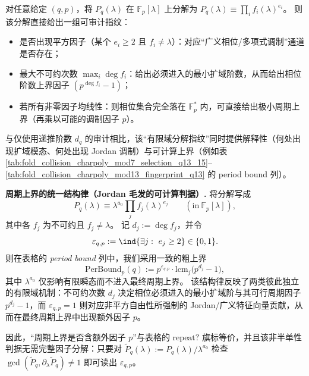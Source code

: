 \begin{remark}\label{rem:pom-charpoly-modp-audit-method}
对任意给定 \((q,p)\)，将 \(P_q(\lambda)\) 在 \(\mathbb{F}_p[\lambda]\) 上分解为
\(
P_q(\lambda)\equiv \prod_i f_i(\lambda)^{e_i}
 \)。
则该分解直接给出一组可审计指纹：
\begin{itemize}
  \item 是否出现平方因子（某个 \(e_i\ge 2\) 且 \(f_i\neq \lambda\)）：对应“广义相位/多项式调制”通道是否存在；
  \item 最大不可约次数 \(\max_i \deg f_i\)：给出必须进入的最小扩域阶数，从而给出相位阶数上界因子 \((p^{\deg f_i}-1)\)；
  \item 若所有非零因子均线性：则相位集合完全落在 \(\mathbb{F}_p^\ast\) 内，可直接给出极小周期上界（再乘以可能的调制因子 \(p\)）。
\end{itemize}
与仅使用递推阶数 \(d_q\) 的审计相比，该“有限域分解指纹”同时提供解释性（何处出现扩域模态、何处出现 Jordan 调制）与可计算上界（例如表 \ref{tab:fold_collision_charpoly_mod7_selection_q13_15}--\ref{tab:fold_collision_charpoly_mod13_fingerprint_q13} 的 period bound 列）。
\par
\textbf{周期上界的统一结构律（Jordan 毛发的可计算判据）.}
将分解写成
\[
P_q(\lambda)\equiv \lambda^{a_0}\prod_{j} f_j(\lambda)^{e_j}\qquad(\mathrm{in}\ \mathbb{F}_p[\lambda]),
\]
其中各 \(f_j\) 为不可约且 \(f_j\neq \lambda\)。
记 \(d_j:=\deg f_j\)，并令
\[
\varepsilon_{q,p}:=\ind\{\exists j:\ e_j\ge 2\}\in\{0,1\}.
\]
则在表格的 \emph{period bound} 列中，我们采用一致的粗上界
\[
\mathrm{PerBound}_p(q):=
p^{\varepsilon_{q,p}}\cdot \mathrm{lcm}_{j}\bigl(p^{d_j}-1\bigr),
\]
其中 \(\lambda^{a_0}\) 仅影响有限瞬态而不进入最终周期上界。
该结构律反映了两类彼此独立的有限域机制：不可约次数 \(d_j\) 决定相位必须进入的最小扩域阶与其可行周期因子 \(p^{d_j}-1\)，而 \(\varepsilon_{q,p}=1\) 则对应非平方自由性所强制的 Jordan/广义特征向量贡献，从而在最终周期上界中出现额外因子 \(p\)。
\par
因此，“周期上界是否含额外因子 \(p\)”与表格的 \(\mathrm{repeat?}\) 旗标等价，并且该非半单性判据无需完整因子分解：只要对 \(\widetilde P_q(\lambda):=P_q(\lambda)/\lambda^{a_0}\) 检查
\(\gcd(\widetilde P_q,\partial_\lambda\widetilde P_q)\neq 1\) 即可读出 \(\varepsilon_{q,p}\)。
\end{remark}


